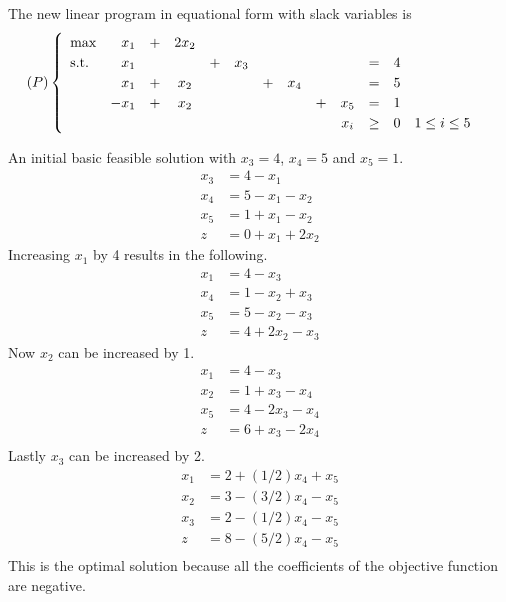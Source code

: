 \documentclass[11pt, oneside]{article}
\begin{document}
\begin{enumerate}
    The new linear program in equational form with slack variables is
    \[
      (P)
      \begin{cases}
        \begin{array}{lr*{11}c}
          \max        & x_1  &+ &2x_2  &  &    &  &     &  &    &    &  & \\
          \text{s.t.} & x_1  &  &      &+ &x_3 &  &     &  &    &=   &4 & \\
                      & x_1  &+ &x_2   &  &    &+ &x_4  &  &    &=   &5 & \\
                      & -x_1 &+ &x_2   &  &    &  &     &+ &x_5 &=   &1 & \\
                      &      &  &      &  &    &  &     &  &x_i &\ge &0 &1 \le i \le 5 \\
        \end{array}
      \end{cases}
    \]

    An initial basic feasible solution with $x_3 = 4$, $x_4 = 5$ and $x_5 = 1$.
    \begin{align*}
      x_3 &= 4 - x_1 \\
      x_4 &= 5 - x_1 - x_2 \\
      x_5 &= 1 + x_1 - x_2 \\
      z   &= 0 + x_1 + 2x_2
    \end{align*}
    Increasing $x_1$ by 4 results in the following.
    \begin{align*}
      x_1 &= 4 - x_3 \\
      x_4 &= 1 - x_2 + x_3 \\
      x_5 &= 5 - x_2 - x_3 \\
      z   &= 4 + 2x_2 - x_3
    \end{align*}
    Now $x_2$ can be increased by 1.
    \begin{align*}
      x_1 &= 4 - x_3 \\
      x_2 &= 1 + x_3 - x_4 \\
      x_5 &= 4 - 2x_3 - x_4  \\
      z   &= 6 + x_3 - 2x_4 \\
    \end{align*}
    Lastly $x_3$ can be increased by 2.
    \begin{align*}
      x_1 &= 2 + (1/2)x_4 + x_5 \\
      x_2 &= 3 -(3/2)x_4 - x_5 \\
      x_3 &= 2 -(1/2)x_4 - x_5 \\
      z   &= 8 - (5/2)x_4 - x_5 \\
    \end{align*}
    This is the optimal solution because all the coefficients of the objective
    function are negative.


\end{enumerate}
\end{document}
